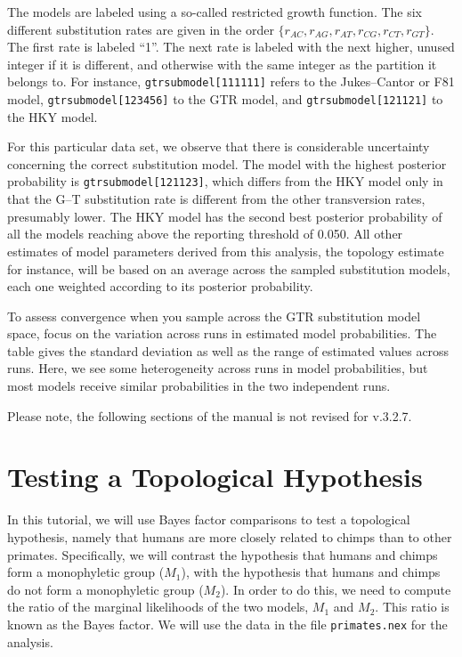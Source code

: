 \documentclass[12pt]{book}
\begin{document}
The models are labeled using a so-called restricted growth function. The six different substitution rates are
given in the order $\{r_{AC},r_{AG},r_{AT},r_{CG},r_{CT},r_{GT}\}$. The first rate is labeled ``1''. The 
next rate is labeled with the next higher, unused integer if it is different, and otherwise with the same integer as the
partition it belongs to. For instance, \texttt{gtrsubmodel[111111]} refers to the Jukes--Cantor or F81 model,
\texttt{gtrsubmodel[123456]} to the GTR model, and \texttt{gtrsubmodel[121121]} to the HKY model.

For this particular data set, we observe that there is considerable uncertainty concerning the correct
substitution model. The model with the highest posterior probability is \texttt{gtrsubmodel[121123]}, which differs
from the HKY model only in that the G--T substitution rate is different from the other transversion rates,
presumably lower. The HKY model has the second best posterior probability of all the models
reaching above the reporting threshold of 0.050. All other estimates of model parameters derived from this
analysis, the topology estimate for instance, will be based on an average across the sampled substitution models,
each one weighted according to its posterior probability.

To assess convergence when you sample across the GTR substitution model space, focus on the variation
across runs in estimated model probabilities. The table gives the standard deviation as well as the range
of estimated values across runs. Here, we see some heterogeneity across runs in model probabilities, but
most models receive similar probabilities in the two independent runs.

\large{Please note, the following sections of the manual is not revised for v.3.2.7.}

\section{Testing a Topological Hypothesis}

In this tutorial, we will use Bayes factor comparisons to test a topological hypothesis, namely that humans are 
more closely related to chimps than to other primates. Specifically, we will contrast the hypothesis that humans and chimps form
a monophyletic group ($M_1$), with the hypothesis that humans and chimps do not form a monophyletic group ($M_2$).
In order to do this, we need to compute the ratio of the marginal likelihoods of the two models, $M_1$ and $M_2$.
This ratio is known as the Bayes factor. We will use the data in the file \texttt{primates.nex} for the analysis.
\end{document}

